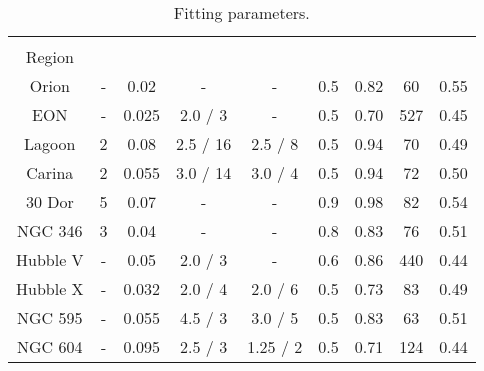 \begin{table*}
\begin{center}\caption{Fitting parameters.}
\begin{tabular}{cCCCCCCCC}\toprule
\hii{}    &   &   &      &       &   &  &  & \\
Region    &   &  &  &   &   &  &  & \\
\midrule
Orion     & - & 0.02    &  -           &   -        & 0.5  & 0.82 & 60  & 0.55\\
EON       & - & 0.025   &  2.0 / 3     &   -        & 0.5  & 0.70 & 527 & 0.45\\
Lagoon    & 2 & 0.08    &  2.5 / 16    &   2.5 / 8  & 0.5  & 0.94 & 70  & 0.49\\
Carina    & 2 & 0.055   &  3.0 / 14    &   3.0 / 4  & 0.5  & 0.94 & 72  & 0.50\\
30 Dor    & 5 &  0.07   &  -           &   -        & 0.9  & 0.98 & 82  & 0.54\\
NGC 346   & 3 & 0.04    &  -           &   -        & 0.8  & 0.83 & 76  & 0.51\\
Hubble V  & - & 0.05    &  2.0 / 3     &   -        & 0.6  & 0.86 & 440 & 0.44\\
Hubble X  & - & 0.032   &  2.0 / 4     &   2.0 / 6  & 0.5  & 0.73 & 83  & 0.49\\
NGC 595   & - &  0.055  &  4.5 / 3     &   3.0 / 5  & 0.5  & 0.83 & 63  & 0.51\\
NGC 604   & - &  0.095  &   2.5 / 3    &   1.25 / 2 & 0.5  & 0.71 & 124 & 0.44\\
\bottomrule
\end{tabular}\label{tab:fitting-parameters}
\end{center}
\end{table*} 